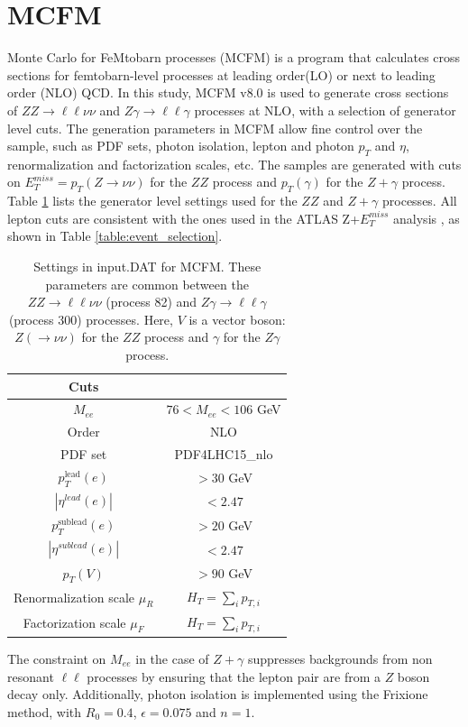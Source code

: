 \documentclass[11pt,a4paper,openright,twoside]{report}
\newcommand{\ZZ}{$ZZ\to \ell\ell\nu\nu$ }
\newcommand{\Zg}{$Z\gamma\to \ell\ell\gamma$ }
\begin{document}
\section{MCFM}\label{sec:MCFM}
Monte Carlo for FeMtobarn processes (MCFM) is a program that calculates cross sections for femtobarn-level processes at leading order(LO) or next to leading order (NLO) QCD. In this study, MCFM v8.0 \cite{MCFM1, MCFM2, MCFM3, MCFM} is used to generate cross sections of \ZZ and \Zg processes at NLO, with a selection of generator level cuts. The generation parameters in MCFM allow fine control over the sample, such as PDF sets, photon isolation, lepton and photon $p_T$ and $\eta$, renormalization and factorization scales, etc. The samples are generated with cuts on $E_T^{miss} = p_T(Z\to \nu\nu)$ for the $ZZ$ process and $p_T(\gamma)$ for the $Z+\gamma$ process. Table \ref{table:default} lists the generator level settings used for the $ZZ$ and $Z+\gamma$ processes. All lepton cuts are consistent with the ones used in the ATLAS Z+$E_T^{miss}$ analysis \cite{ZH_ATLAS}, as shown in Table \ref{table:event_selection}.

{\renewcommand{\arraystretch}{1.5}
\begin{table}[H]
\centering
	\begin{tabular}{c c}
	\hline
	\hline
	\textbf{Cuts} &\\
	\hline
	$M_{ee}$ & $76 < M_{ee} < 106$ GeV\\
	\hline
	Order & NLO \\
	\hline
	PDF set & PDF4LHC15\_nlo\\
	\hline
	$p_T^{\text{lead}}(e)$ & $> 30$ GeV \\
	\hline
	$|\eta^{lead}(e)|$ & $< 2.47$\\
	\hline
	$p_T^{\text{sublead}}(e)$ & $> 20$ GeV\\
	\hline
	$|\eta^{sublead}(e)|$ & $< 2.47$\\
	\hline
	$p_T(V)$\footnotemark & $> 90$ GeV\\
	\hline
	Renormalization scale $\mu_R$& $H_T = \sum_{i}p_{T,i}$\\
	\hline
	Factorization scale $\mu_F$& $H_T = \sum_{i}p_{T,i}$\\
	\hline
	\hline
	\end{tabular}
	\caption{Settings in input.DAT for MCFM. These parameters are common between the \ZZ (process 82) and \Zg (process 300) processes. Here, $V$ is a vector boson: $Z(\to\nu\nu)$ for the $ZZ$ process and $\gamma$ for the $Z\gamma$ process.}
	\label{table:default}
\end{table}
}
The constraint on $M_{ee}$ in the case of $Z+\gamma$ suppresses backgrounds from non resonant $\ell\ell$ processes by ensuring that the lepton pair are from a $Z$ boson decay only. Additionally, photon isolation is implemented using the Frixione \cite{frixione} method, with $R_0=0.4$, $\epsilon=0.075$ and $n=1$.
\end{document}
